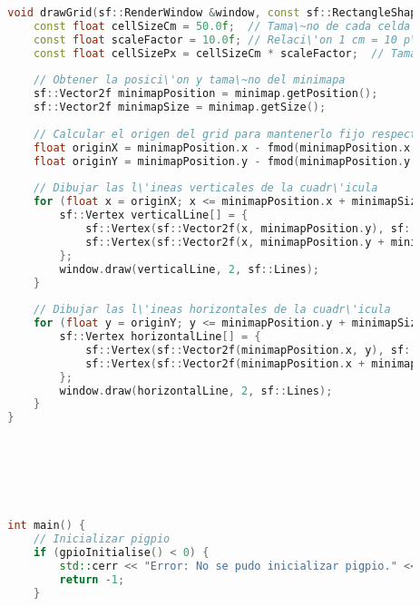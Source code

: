 \begin{lstlisting}[language={C++}, caption={Quinto ajuste de c\'odigo}, label={QuintoAjuste}]
        
        
        
        
        
        
        
        
        void drawGrid(sf::RenderWindow &window, const sf::RectangleShape &minimap) {
            const float cellSizeCm = 50.0f;  // Tama\~no de cada celda en cent\'imetros
            const float scaleFactor = 10.0f; // Relaci\'on 1 cm = 10 p\'ixeles en el minimapa
            const float cellSizePx = cellSizeCm * scaleFactor;  // Tama\~no de cada celda en p\'ixeles
        
            // Obtener la posici\'on y tama\~no del minimapa
            sf::Vector2f minimapPosition = minimap.getPosition();
            sf::Vector2f minimapSize = minimap.getSize();
        
            // Calcular el origen del grid para mantenerlo fijo respecto al robot centrado en (105, 105)
            float originX = minimapPosition.x - fmod(minimapPosition.x + 105.0f, cellSizePx);
            float originY = minimapPosition.y - fmod(minimapPosition.y + 105.0f, cellSizePx);
        
            // Dibujar las l\'ineas verticales de la cuadr\'icula
            for (float x = originX; x <= minimapPosition.x + minimapSize.x; x += cellSizePx) {
                sf::Vertex verticalLine[] = {
                    sf::Vertex(sf::Vector2f(x, minimapPosition.y), sf::Color(150, 150, 150, 200)),
                    sf::Vertex(sf::Vector2f(x, minimapPosition.y + minimapSize.y), sf::Color(150, 150, 150, 200))
                };
                window.draw(verticalLine, 2, sf::Lines);
            }
        
            // Dibujar las l\'ineas horizontales de la cuadr\'icula
            for (float y = originY; y <= minimapPosition.y + minimapSize.y; y += cellSizePx) {
                sf::Vertex horizontalLine[] = {
                    sf::Vertex(sf::Vector2f(minimapPosition.x, y), sf::Color(150, 150, 150, 200)),
                    sf::Vertex(sf::Vector2f(minimapPosition.x + minimapSize.x, y), sf::Color(150, 150, 150, 200))
                };
                window.draw(horizontalLine, 2, sf::Lines);
            }
        }
        
        
        
        
        
        
        
        int main() {
            // Inicializar pigpio
            if (gpioInitialise() < 0) {
                std::cerr << "Error: No se pudo inicializar pigpio." << std::endl;
                return -1;
            }
        

\end{lstlisting}
